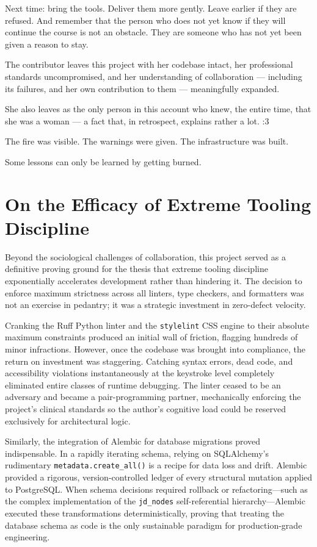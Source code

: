 \documentclass[11pt,a4paper]{book}
\begin{document}
Next time: bring the tools. Deliver them more gently. Leave earlier if they are refused. And remember that the person who does not yet know if they will continue the course is not an obstacle. They are someone who has not yet been given a reason to stay.

The contributor leaves this project with her codebase intact, her professional standards uncompromised, and her understanding of collaboration --- including its failures, and her own contribution to them --- meaningfully expanded.

She also leaves as the only person in this account who knew, the entire time, that she was a woman --- a fact that, in retrospect, explains rather a lot. :3

The fire was visible. The warnings were given. The infrastructure was built.

Some lessons can only be learned by getting burned.

\section{On the Efficacy of Extreme Tooling Discipline}

Beyond the sociological challenges of collaboration, this project served as a definitive proving ground for the thesis that extreme tooling discipline exponentially accelerates development rather than hindering it. The decision to enforce maximum strictness across all linters, type checkers, and formatters was not an exercise in pedantry; it was a strategic investment in zero-defect velocity.

Cranking the Ruff Python linter and the \texttt{stylelint} CSS engine to their absolute maximum constraints produced an initial wall of friction, flagging hundreds of minor infractions. However, once the codebase was brought into compliance, the return on investment was staggering. Catching syntax errors, dead code, and accessibility violations instantaneously at the keystroke level completely eliminated entire classes of runtime debugging. The linter ceased to be an adversary and became a pair-programming partner, mechanically enforcing the project's clinical standards so the author's cognitive load could be reserved exclusively for architectural logic.

Similarly, the integration of Alembic for database migrations proved indispensable. In a rapidly iterating schema, relying on SQLAlchemy's rudimentary \texttt{metadata.create\_all()} is a recipe for data loss and drift. Alembic provided a rigorous, version-controlled ledger of every structural mutation applied to PostgreSQL. When schema decisions required rollback or refactoring---such as the complex implementation of the \texttt{jd\_nodes} self-referential hierarchy---Alembic executed these transformations deterministically, proving that treating the database schema as code is the only sustainable paradigm for production-grade engineering.
\end{document}

